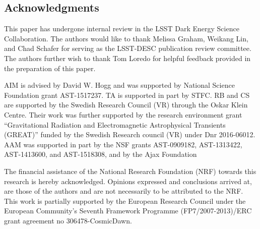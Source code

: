 \documentclass[\docopts]{\docclass}
\begin{document}














\subsection*{Acknowledgments}




This paper has undergone internal review in the LSST Dark Energy Science Collaboration. %
The authors would like to thank Melissa Graham, Weikang Lin, and Chad Schafer for serving as the LSST-DESC publication review committee.
The authors further wish to thank Tom Loredo for helpful feedback provided in the preparation of this paper.

AIM is advised by David W. Hogg and was supported by National Science Foundation grant AST-1517237.
TA is supported in part by STFC.
RB and CS are supported by the Swedish Research Council (VR) through the Oskar Klein Centre.
Their work was further supported by the research environment grant ``Gravitational Radiation and Electromagnetic Astrophysical Transients (GREAT)'' funded by the Swedish Research council (VR) under Dnr 2016-06012.
AAM was supported in part by the NSF grants AST-0909182, AST-1313422, AST-1413600, and AST-1518308, and by the Ajax Foundation

The financial assistance of the National Research Foundation (NRF) towards this research is hereby acknowledged.
Opinions expressed and conclusions arrived at, are those of the authors and are not necessarily to be attributed to the NRF.
This work is partially supported by the European Research Council under the European Community’s Seventh Framework Programme (FP7/2007-2013)/ERC grant agreement no 306478-CosmicDawn.
\end{document}
